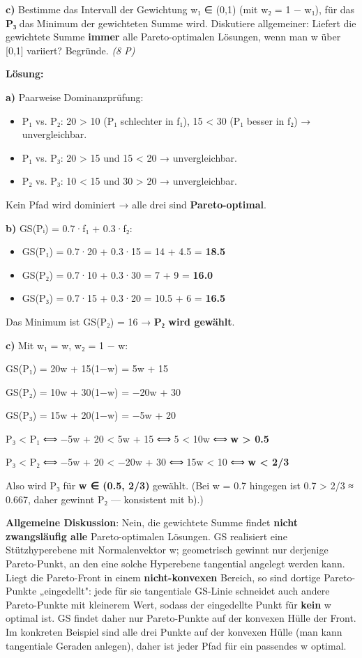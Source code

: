 \documentclass[11pt, a4paper]{article}
\begin{document}
\textbf{c)} Bestimme das Intervall der Gewichtung w₁ ∈ (0,1) (mit w₂ = 1 − w₁), für das \textbf{P₃} das Minimum der gewichteten Summe wird. Diskutiere allgemeiner: Liefert die gewichtete Summe \textbf{immer} alle Pareto-optimalen Lösungen, wenn man w über [0,1] variiert? Begründe. \textit{(8 P)}


\textbf{Lösung:}


\textbf{a)} Paarweise Dominanzprüfung:

\begin{itemize}
  \item P₁ vs. P₂: 20 > 10 (P₁ schlechter in f₁), 15 < 30 (P₁ besser in f₂) → unvergleichbar.
  \item P₁ vs. P₃: 20 > 15 und 15 < 20 → unvergleichbar.
  \item P₂ vs. P₃: 10 < 15 und 30 > 20 → unvergleichbar.
\end{itemize}

Kein Pfad wird dominiert → alle drei sind \textbf{Pareto-optimal}.


\textbf{b)} GS(Pᵢ) = 0.7·f₁ + 0.3·f₂:

\begin{itemize}
  \item GS(P₁) = 0.7·20 + 0.3·15 = 14 + 4.5 = \textbf{18.5}
  \item GS(P₂) = 0.7·10 + 0.3·30 = 7 + 9 = \textbf{16.0}
  \item GS(P₃) = 0.7·15 + 0.3·20 = 10.5 + 6 = \textbf{16.5}
\end{itemize}

Das Minimum ist GS(P₂) = 16 → \textbf{P₂ wird gewählt}.


\textbf{c)} Mit w₁ = w, w₂ = 1 − w:


GS(P₁) = 20w + 15(1−w) = 5w + 15

GS(P₂) = 10w + 30(1−w) = −20w + 30

GS(P₃) = 15w + 20(1−w) = −5w + 20


P₃ < P₁ ⟺ −5w + 20 < 5w + 15 ⟺ 5 < 10w ⟺ \textbf{w > 0.5}

P₃ < P₂ ⟺ −5w + 20 < −20w + 30 ⟺ 15w < 10 ⟺ \textbf{w < 2/3}


Also wird P₃ für \textbf{w ∈ (0.5, 2/3)} gewählt. (Bei w = 0.7 hingegen ist 0.7 > 2/3 ≈ 0.667, daher gewinnt P₂ — konsistent mit b).)


\textbf{Allgemeine Diskussion}: Nein, die gewichtete Summe findet \textbf{nicht zwangsläufig alle} Pareto-optimalen Lösungen. GS realisiert eine Stützhyperebene mit Normalenvektor w; geometrisch gewinnt nur derjenige Pareto-Punkt, an den eine solche Hyperebene tangential angelegt werden kann. Liegt die Pareto-Front in einem \textbf{nicht-konvexen} Bereich, so sind dortige Pareto-Punkte „eingedellt": jede für sie tangentiale GS-Linie schneidet auch andere Pareto-Punkte mit kleinerem Wert, sodass der eingedellte Punkt für \textbf{kein} w optimal ist. GS findet daher nur Pareto-Punkte auf der konvexen Hülle der Front. Im konkreten Beispiel sind alle drei Punkte auf der konvexen Hülle (man kann tangentiale Geraden anlegen), daher ist jeder Pfad für ein passendes w optimal.
\end{document}

